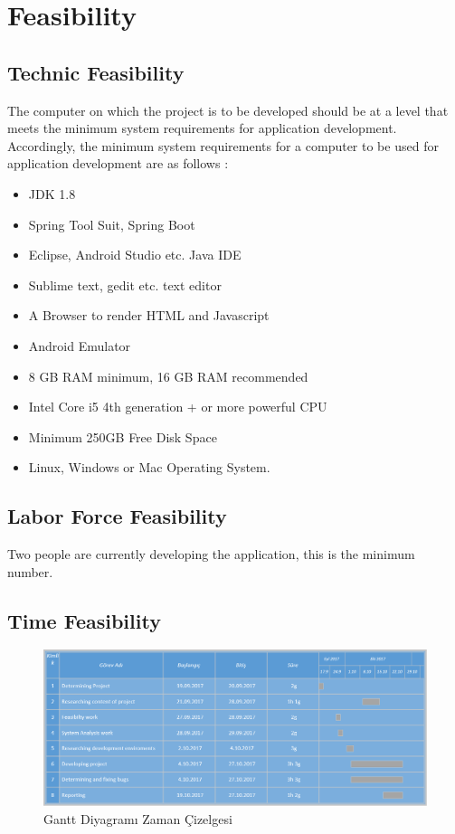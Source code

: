 \chapter{Feasibility}

\section{Technic Feasibility}
The computer on which the project is to be developed should be at a level that meets the minimum system requirements for application development. Accordingly, the minimum system requirements for a computer to be used for application development are as follows :

\begin{itemize}
    \item JDK 1.8
    \item Spring Tool Suit, Spring Boot
    \item Eclipse, Android Studio etc. Java IDE
    \item Sublime text, gedit etc. text editor
    \item A Browser to render HTML and Javascript
    \item Android Emulator 
    \item 8 GB RAM minimum, 16 GB RAM recommended
	\item Intel Core i5 4th generation + or more powerful CPU
	\item Minimum 250GB Free Disk Space    
    \item Linux, Windows or Mac Operating System.
    
\end{itemize}


\section{Labor Force Feasibility}
Two people are currently developing the application, this is the minimum number.



\section{Time Feasibility}
\begin{figure}[!htbp]
\centering
\includegraphics[width=\textwidth]{projectChapters/images/gantt.png}
\caption{Gantt Diyagramı Zaman Çizelgesi}
\end{figure}


